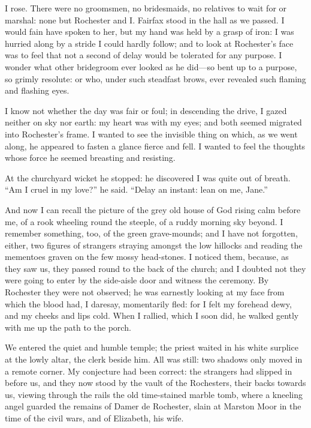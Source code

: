 I rose. There were no groomsmen, no bridesmaids, no relatives to wait
for or marshal: none but \Mr{} Rochester and I\@. \Mrs{} Fairfax stood in the
hall as we passed.  I would fain have spoken to her, but my hand was
held by a grasp of iron: I was hurried along by a stride I could hardly
follow; and to look at \Mr{} Rochester's face was to feel that not a
second of delay would be tolerated for any purpose. I wonder what other
bridegroom ever looked as he did---so bent up to a purpose, so grimly
resolute: or who, under such steadfast brows, ever revealed such flaming
and flashing eyes.

I know not whether the day was fair or foul; in descending the drive, I
gazed neither on sky nor earth: my heart was with my eyes; and both
seemed migrated into \Mr{} Rochester's frame. I wanted to see the
invisible thing on which, as we went along, he appeared to fasten a
glance fierce and fell. I wanted to feel the thoughts whose force he
seemed breasting and resisting.

At the churchyard wicket he stopped: he discovered I was quite out of
breath. \enquote{Am I cruel in my love?} he said. \enquote{Delay an
	instant: lean on me, Jane.}

And now I can recall the picture of the grey old house of God rising
calm before me, of a rook wheeling round the steeple, of a ruddy morning
sky beyond. I remember something, too, of the green grave-mounds; and I
have not forgotten, either, two figures of strangers straying amongst
the low hillocks and reading the mementoes graven on the few mossy
head-stones. I noticed them, because, as they saw us, they passed round
to the back of the church; and I doubted not they were going to enter by
the side-aisle door and witness the ceremony. By \Mr{} Rochester they
were not observed; he was earnestly looking at my face from which the
blood had, I daresay, momentarily fled: for I felt my forehead dewy, and
my cheeks and lips cold. When I rallied, which I soon did, he walked
gently with me up the path to the porch.

We entered the quiet and humble temple; the priest waited in his white
surplice at the lowly altar, the clerk beside him. All was still: two
shadows only moved in a remote corner. My conjecture had been correct:
the strangers had slipped in before us, and they now stood by the vault
of the Rochesters, their backs towards us, viewing through the rails the
old time-stained marble tomb, where a kneeling angel guarded the remains
of Damer de Rochester, slain at Marston Moor in the time of the civil
wars, and of Elizabeth, his wife.

